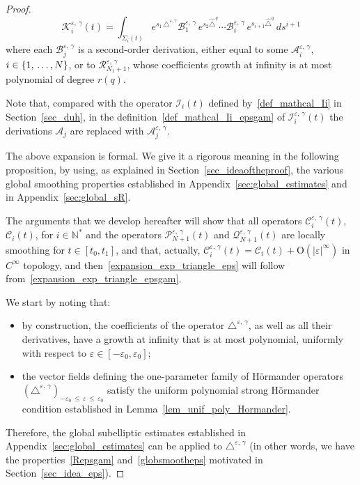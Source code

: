 \documentclass[AHL,Unicode,published]{cedram}
\newcommand*\N{\mathbb{N}}
\newcommand{\calQ}{\mathcal{Q}}
\newcommand{\calK}{\mathcal{K}}
\newcommand{\calA}{\mathcal{A}}
\newcommand{\calR}{\mathcal{R}}
\newcommand{\calC}{\mathcal{C}}
\newcommand{\calI}{\mathcal{I}}
\newcommand{\calP}{\mathcal{P}}
\newcommand{\calB}{\mathcal{B}}
\newcommand{\rmO}{\mathrm{O}}
\renewcommand{\leq}{\leqslant}
\begin{document}
\begin{proof}
\begin{equation}
\end{equation}
\begin{equation}\label{def_mathcal_Kiepsgam}
\calK_i^{\varepsilon,\,\gamma}(t) = \int_{\Sigma_i(t)} e^{s_1 \,\triangle^{\varepsilon,\gamma}} \calB_{1}^{\varepsilon,\,\gamma} \, e^{s_2 \widehat{\triangle}^{q}} \cdots \calB_i^{\varepsilon,\,\gamma} \, e^{s_{i+1} \widehat{\triangle}^{q}} \, ds^{i+1}
\end{equation}
where each $\calB_{j}^{\varepsilon,\,\gamma}$ is a second-order derivation, either equal to some $\calA_i^{\varepsilon,\,\gamma}$, $i\in\{1,\,\ldots,\linebreak N\}$, or to $\calR_{N_1+1}^{\varepsilon,\,\gamma}$, whose coefficients growth at infinity is at most polynomial of degree $r(q)$.

Note that, compared with the operator $\calI_i(t)$ defined by~\eqref{def_mathcal_Ii} in Section~\ref{sec_duh}, in the definition~\eqref{def_mathcal_Ii_epsgam} of $\calI_i^{\varepsilon,\,\gamma}(t)$ the derivations $\calA_j$ are replaced with $\calA_j^{\varepsilon,\,\gamma}$.

The above expansion is formal. We give it a rigorous meaning in the following proposition, by using, as explained in Section~\ref{sec_ideaoftheproof}, the various global smoothing properties established in Appendix~\ref{sec:global_estimates} and in Appendix~\ref{sec:global_sR}.

The arguments that we develop hereafter will show that all operators $\calC_i^{\varepsilon,\,\gamma}(t)$, $\calC_i(t)$, for $i\in\N^*$ and the operators $\calP_{N+1}^{\varepsilon,\,\gamma}(t)$ and $\calQ_{N+1}^{\varepsilon,\,\gamma}(t)$ are locally smoothing for $t\in[t_0,t_1]$, and that, actually, $\calC_i^{\varepsilon,\,\gamma}(t) = \calC_i(t) + \rmO(\vert\varepsilon\vert^\infty)$ in $C^\infty$ topology, and then~\eqref{expansion_exp_triangle_eps} will follow from~\eqref{expansion_exp_triangle_epsgam}.

We start by noting that:
\begin{itemize}
\item by construction, the coefficients of the operator $\triangle^{\varepsilon,\,\gamma}$, as well as all their derivatives, have a growth at infinity that is at most polynomial, uniformly with respect to $\varepsilon\in[-\varepsilon_0,\varepsilon_0]$;
\item the vector fields defining the one-parameter family of H\"ormander operators $(\triangle^{\varepsilon,\,\gamma})_{-\varepsilon_0\,\leq\,\varepsilon\,\leq\,\varepsilon_0}$ satisfy the uniform polynomial strong H\"ormander condition established in Lemma~\ref{lem_unif_poly_Hormander}.
\end{itemize}
Therefore, the global subelliptic estimates established in Appendix~\ref{sec:global_estimates} can be applied to $\triangle^{\varepsilon,\,\gamma}$ (in other words, we have the properties~\eqref{Repsgam} and~\eqref{globsmootheps} motivated in Section~\ref{sec_idea_eps}).


\end{proof}
\end{document}
